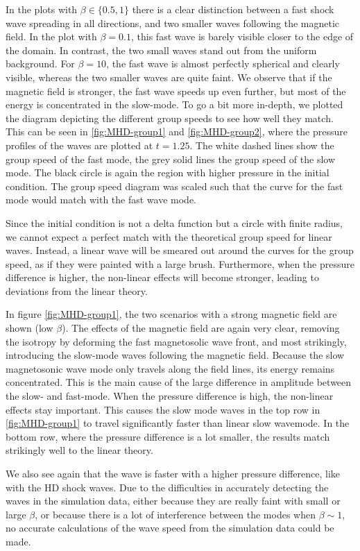 In the plots with $\beta \in \{0.5,1\}$ there is a clear distinction between a fast shock wave spreading in all directions, and two smaller waves following the magnetic field.
In the plot with $\beta=0.1$, this fast wave is barely visible closer to the edge of the domain. In contrast, the two small waves stand out from the uniform background.
For $\beta=10$, the fast wave is almost perfectly spherical and clearly visible, whereas the two smaller waves are quite faint.
We observe that if the magnetic field is stronger, the fast wave speeds up even further, but most of the energy is concentrated in the slow-mode.
To go a bit more in-depth, we plotted the diagram depicting the different group speeds to see how well they match. 
This can be seen in \cref{fig:MHD-group1} and \cref{fig:MHD-group2}, where the pressure profiles of the waves are plotted at $t=1.25$.
The white dashed lines show the group speed of the fast mode, the grey solid lines the group speed of the slow mode. 
The black circle is again the region with higher pressure in the initial condition.
The group speed diagram was scaled such that the curve for the fast mode would match with the fast wave mode.

Since the initial condition is not a delta function but a circle with finite radius, we cannot expect a perfect match with the theoretical group speed for linear waves.
Instead, a linear wave will be smeared out around the curves for the group speed, as if they were painted with a large brush.
Furthermore, when the pressure difference is higher, the non-linear effects will become stronger, leading to deviations from the linear theory.

In figure \cref{fig:MHD-group1}, the two scenarios with a strong magnetic field are shown (low $\beta$).
The effects of the magnetic field are again very clear, removing the isotropy by deforming the fast magnetosolic wave front, and most strikingly, introducing the slow-mode waves following the magnetic field.
Because the slow magnetosonic wave mode only travels along the field lines, its energy remains concentrated. This is the main cause of the large difference in amplitude between the slow- and fast-mode.
When the pressure difference is high, the non-linear effects stay important. 
This causes the slow mode waves in the top row in \cref{fig:MHD-group1} to travel significantly faster than linear slow wavemode.
In the bottom row, where the pressure difference is a lot smaller, the results match strikingly well to the linear theory.

We also see again that the wave is faster with a higher pressure difference, like with the HD shock waves. 
Due to the difficulties in accurately detecting the waves in the simulation data, either because they are really faint with small or large $\beta$, or because there is a lot of interference between the modes when $\beta \sim 1$, no accurate calculations of the wave speed from the simulation data could be made.

